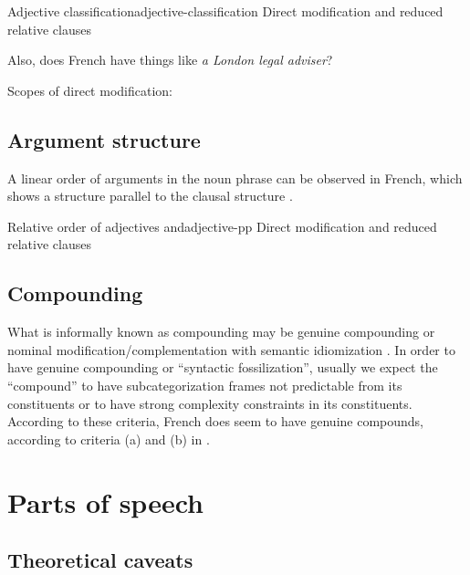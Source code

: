 \documentclass[a4paper, oneside, 12pt]{report}
\newcommand*{\citesec}[1]{\S~{#1}}
\newcommand*{\citechap}[1]{chap.~{#1}}
\newcommand*{\citepage}[1]{p.~{#1}}
\newcommand{\form}[1]{\emph{#1}}
\begin{document}
\begin{todobox}{Adjective classification}{adjective-classification}
    Direct modification and reduced relative clauses

    Also, does French have things like \form{a London legal adviser}?
    
    Scopes of direct modification: \citep[\citesec{3.7.1}]{rowlett2007syntax}
\end{todobox}


\subsection{Argument structure}

A linear order of arguments in the noun phrase can be observed in French,
which shows a structure parallel to the clausal structure \citep[\citepage{21}]{rowlett2007syntax}.

\begin{todobox}{Relative order of adjectives and}{adjective-pp}
    Direct modification and reduced relative clauses
\end{todobox}

\subsection{Compounding}\label{sec:grammatical.np.compound}

What is informally known as compounding may be 
genuine compounding or nominal modification/complementation with semantic idiomization
\citep[\citechap{5}, \citesec{14.4}]{cgel}.
In order to have genuine compounding or ``syntactic fossilization'',
usually we expect the ``compound'' to have subcategorization frames
not predictable from its constituents
or to have strong complexity constraints in its constituents.
According to these criteria, French does seem to have genuine compounds,
according to criteria (a) and (b) in \citet[\citepage{15}]{rowlett2007syntax}.

\section{Parts of speech}

\subsection{Theoretical caveats}\label{sec:grammatical.pos.theory}
\end{document}
